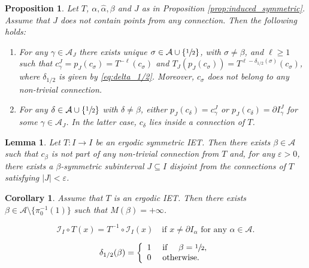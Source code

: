 \documentclass[10pt,a4paper]{article}
\let\epsilon\varepsilon
\theoremstyle{plain}
\newtheorem{lemma}[theorem]{Lemma}
\newtheorem{proposition}[theorem]{Proposition}
\newtheorem{corollary}[theorem]{Corollary}
\theoremstyle{definition}
\newcommand{\A}{\mathcal{A}}
\begin{document}
\begin{proposition}
\label{prop:induced_centers}
Let $T$, $\alpha, \hat \alpha, \beta$ and $J$ as in Proposition \ref{prop:induced_symmetric}. Assume that $J$ does not contain points from any connection. Then the following holds:
\begin{enumerate}
\item For any $\gamma \in \A_J$ there exists unique $\sigma \in \A \cup \{\sfrac{1}{2}\}$, with $ \sigma \neq \beta$, and $\ell \geq 1$ such that $c_\gamma^J = p_J(c_\sigma) = T^{-\ell}(c_\sigma)$ and $T_J(p_J(c_\sigma)) = T^{\ell - \delta_{1/2}(\sigma)}(c_\sigma)$, where $\delta_{1/2}$ is given by \eqref{eq:delta_1/2}. Moreover, $c_\sigma$ does not belong to any non-trivial connection.
\item For any $\delta \in \A \cup \{\sfrac{1}{2}\}$ with $\delta \neq \beta$, either $p_J(c_\delta) = c_\gamma^J$ or $p_J(c_\delta) = \partial I_\gamma^J$ for some $\gamma \in \A_J$. In the latter case, $c_\delta$ lies inside a connection of $T$.
\end{enumerate}
\end{proposition}

\begin{lemma}
\label{lem:sym_int_disjoint}
Let $T: I \to I$ be an ergodic symmetric IET. Then there exists $\beta \in \A$ such that $c_\beta$ is not part of any non-trivial connection from $T$ and, for any $\epsilon > 0$, there exists a $\beta$-symmetric subinterval $J\subseteq I$ disjoint from the connections of $T$ satisfying $|J| < \epsilon$.
\end{lemma}

\begin{corollary}\label{cor: existenceofinfiniteorbit}
Assume that $T$ is an ergodic IET. Then there exists {$\beta \in\mathcal A \setminus \{\pi_0^{-1}(1)\}$ such that $M(\beta) = +\infty$. }
\end{corollary}

\begin{equation}\label{eq: standardconjugacy}
\mathcal{I}_I\circ T(x)=T^{-1}\circ\mathcal{I}_I(x) \quad \text{if } x \neq \partial I_{\alpha} \text{ for any } \alpha \in \A.
\end{equation}

\begin{equation}
\label{eq:delta_1/2}
\delta_{1/2}(\beta) = \left\{\begin{array}{ll} 1 & \text{ if } \quad \beta = \sfrac{1}{2}, \\
0 & \text{ otherwise}.
\end{array} \right.
\end{equation}
\end{document}
